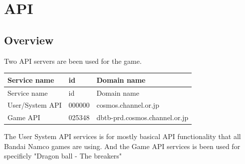 \section{API}

\subsection{Overview}

Two API servers are been used for the game.

\begin{longtable}{>{\ttfamily}p{}p{}p{}}
\toprule
Service name & id & Domain name \\
\midrule
\endfirsthead%

\toprule
Service name & id & Domain name \\
\midrule
\endhead%

User/System API
	& 000000
    & cosmos.channel.or.jp \\

Game API
	& 025348
    & dbtb-prd.cosmos.channel.or.jp \\

\bottomrule
\end{longtable}

The User System API services is for mostly basical API functionality that all Bandai Namco games are using.
And the Game API services is been used for specificly "Dragon ball - The breakers" 

\newpage